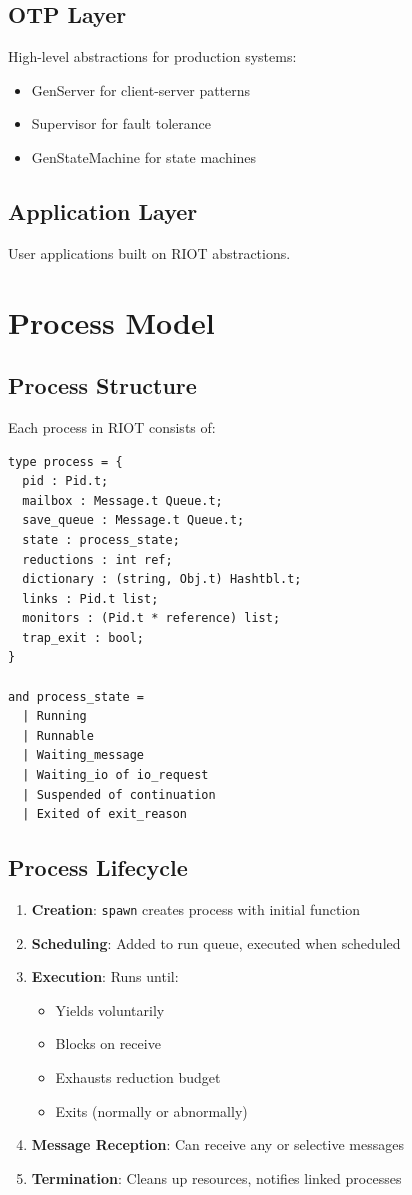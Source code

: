 \documentclass[12pt,a4paper]{report}
\begin{document}
\subsection{OTP Layer}
High-level abstractions for production systems:
\begin{itemize}
\item GenServer for client-server patterns
\item Supervisor for fault tolerance
\item GenStateMachine for state machines
\end{itemize}

\subsection{Application Layer}
User applications built on RIOT abstractions.

\section{Process Model}

\subsection{Process Structure}

Each process in RIOT consists of:

\begin{lstlisting}
type process = {
  pid : Pid.t;
  mailbox : Message.t Queue.t;
  save_queue : Message.t Queue.t;
  state : process_state;
  reductions : int ref;
  dictionary : (string, Obj.t) Hashtbl.t;
  links : Pid.t list;
  monitors : (Pid.t * reference) list;
  trap_exit : bool;
}

and process_state =
  | Running
  | Runnable  
  | Waiting_message
  | Waiting_io of io_request
  | Suspended of continuation
  | Exited of exit_reason
\end{lstlisting}

\subsection{Process Lifecycle}

\begin{enumerate}
\item \textbf{Creation}: \texttt{spawn} creates process with initial function
\item \textbf{Scheduling}: Added to run queue, executed when scheduled
\item \textbf{Execution}: Runs until:
   \begin{itemize}
   \item Yields voluntarily
   \item Blocks on receive
   \item Exhausts reduction budget
   \item Exits (normally or abnormally)
   \end{itemize}
\item \textbf{Message Reception}: Can receive any or selective messages
\item \textbf{Termination}: Cleans up resources, notifies linked processes
\end{enumerate}
\end{document}
